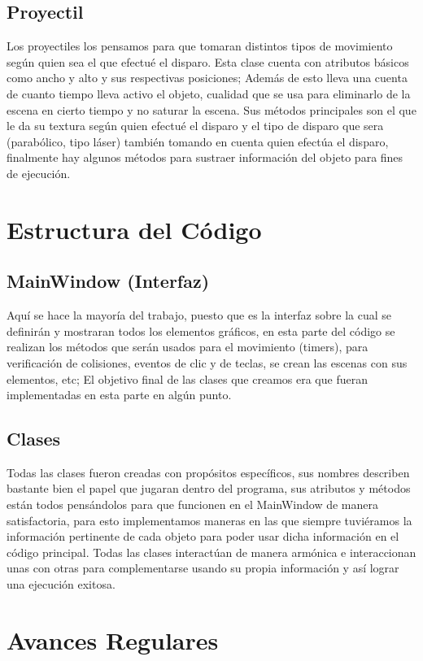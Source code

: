 \documentclass{article}
\begin{document}
    \subsection{Proyectil}
    Los proyectiles los pensamos para que tomaran distintos tipos de movimiento según quien sea el que efectué el disparo. Esta clase cuenta con atributos básicos como ancho y alto y sus respectivas posiciones; Además de esto lleva una cuenta de cuanto tiempo lleva activo el objeto, cualidad que se usa para eliminarlo de la escena en cierto tiempo y no saturar la escena. Sus métodos principales son el que le da su textura según quien efectué el disparo y el tipo de disparo que sera (parabólico, tipo láser) también tomando en cuenta quien efectúa el disparo, finalmente hay algunos métodos para sustraer información del objeto para fines de ejecución.
    
        
\section{Estructura del Código}
    \subsection{MainWindow (Interfaz)}
    Aquí se hace la mayoría del trabajo, puesto que es la interfaz sobre la cual se definirán y mostraran todos los elementos gráficos, en esta parte del código se realizan los métodos que serán usados para el movimiento (timers), para verificación de colisiones, eventos de clic y de teclas, se crean las escenas con sus elementos, etc; El objetivo final de las clases que creamos era que fueran implementadas en esta parte en algún punto.
    
    \subsection{Clases}
    Todas las clases fueron creadas con propósitos específicos, sus nombres describen bastante bien el papel que jugaran dentro del programa, sus atributos y métodos están todos pensándolos para que funcionen en el MainWindow de manera satisfactoria, para esto implementamos maneras en las que siempre tuviéramos la información pertinente de cada objeto para poder usar dicha información en el código principal. Todas las clases interactúan de manera armónica e interaccionan unas con otras para complementarse usando su propia información y así lograr una ejecución exitosa. 
    
\section{Avances Regulares}
\end{document}
